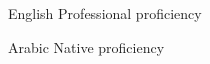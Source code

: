 
\begin{cvskills}
	\cvskill
	{English} %
	{Professional proficiency} %

	\cvskill
	{Arabic} %
	{Native proficiency} %
\end{cvskills}
